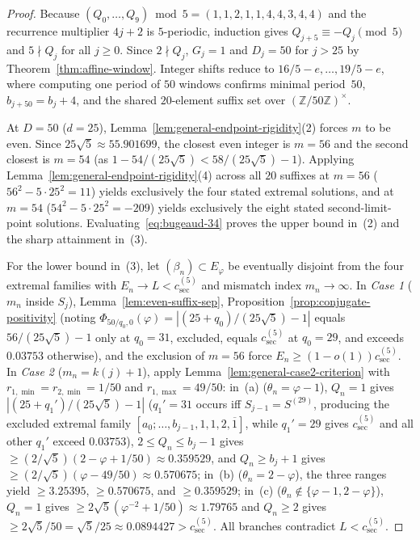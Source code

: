 \documentclass[11pt]{amsart}
\theoremstyle{definition}
\theoremstyle{remark}
\numberwithin{equation}{section}
\newcommand{\Z}{\mathbb{Z}}
\begin{document}
\begin{proof}
Because $(Q_0,\ldots,Q_9)\bmod5=(1,1,2,1,1,4,4,3,4,4)$ and the recurrence
multiplier $4j+2$ is $5$-periodic, induction gives $Q_{j+5}\equiv-Q_j\pmod5$
and $5\nmid Q_j$ for all $j\ge0$. Since $2\nmid Q_j$, $G_j=1$ and $D_j=50$ for
$j>25$ by Theorem~\ref{thm:affine-window}. Integer shifts reduce to
$16/5-e,\ldots,19/5-e$, where computing one period of $50$ windows confirms
minimal period~$50$, $b_{j+50}=b_j+4$, and the shared $20$-element suffix set
over $(\Z/50\Z)^\times$.

At $D=50$ ($d=25$), Lemma~\ref{lem:general-endpoint-rigidity}(2) forces $m$ to
be even. Since $25\sqrt5\approx55.901699$, the closest even integer is $m=56$
and the second closest is $m=54$ (as $1-54/(25\sqrt5)<58/(25\sqrt5)-1$).
Applying Lemma~\ref{lem:general-endpoint-rigidity}(4) across all $20$ suffixes
at $m=56$ ($56^2-5\cdot25^2=11$) yields exclusively the four stated extremal
solutions, and at $m=54$ ($54^2-5\cdot25^2=-209$) yields exclusively the eight
stated second-limit-point solutions. Evaluating~\eqref{eq:bugeaud-34} proves
the upper bound in~(2) and the sharp attainment in~(3).

For the lower bound in~(3), let $(\beta_n)\subset E_\varphi$ be eventually
disjoint from the four extremal families with $E_n\to L<c_{\mathrm{sec}}^{(5)}$
and mismatch index $m_n\to\infty$.
In \emph{Case 1} ($m_n$ inside $S_j$), Lemma~\ref{lem:even-suffix-sep},
Proposition~\ref{prop:conjugate-positivity} (noting
$\Phi_{50/q_0,0}(\varphi)=|(25+q_0)/(25\sqrt5)-1|$ equals
$56/(25\sqrt5)-1$ only at $q_0=31$, excluded, equals $c_{\mathrm{sec}}^{(5)}$
at $q_0=29$, and exceeds $0.03753$ otherwise), and the exclusion of $m=56$
force $E_n\ge(1-o(1))c_{\mathrm{sec}}^{(5)}$.
In \emph{Case 2} ($m_n=k(j)+1$), apply Lemma~\ref{lem:general-case2-criterion}
with $r_{1,\min}=r_{2,\min}=1/50$ and $r_{1,\max}=49/50$:
in~(a) ($\theta_n=\varphi-1$), $Q_n=1$ gives $|(25+q_1')/(25\sqrt5)-1|$
($q_1'=31$ occurs iff $S_{j-1}=S^{(29)}$, producing the excluded extremal
family $[a_0;\ldots,b_{j-1},1,1,2,\overline1]$, while $q_1'=29$ gives
$c_{\mathrm{sec}}^{(5)}$ and all other $q_1'$ exceed $0.03753$),
$2\le Q_n\le b_j-1$ gives $\ge(2/\sqrt5)(2-\varphi+1/50)\approx0.359529$,
and $Q_n\ge b_j+1$ gives $\ge(2/\sqrt5)(\varphi-49/50)\approx0.570675$;
in~(b) ($\theta_n=2-\varphi$), the three ranges yield $\ge3.25395$, $\ge0.570675$,
and $\ge0.359529$; in~(c) ($\theta_n\notin\{\varphi-1,2-\varphi\}$), $Q_n=1$
gives $\ge2\sqrt5(\varphi^{-2}+1/50)\approx1.79765$ and $Q_n\ge2$ gives
$\ge2\sqrt5/50=\sqrt5/25\approx0.0894427>c_{\mathrm{sec}}^{(5)}$.
All branches contradict $L<c_{\mathrm{sec}}^{(5)}$.
\end{proof}
\end{document}
